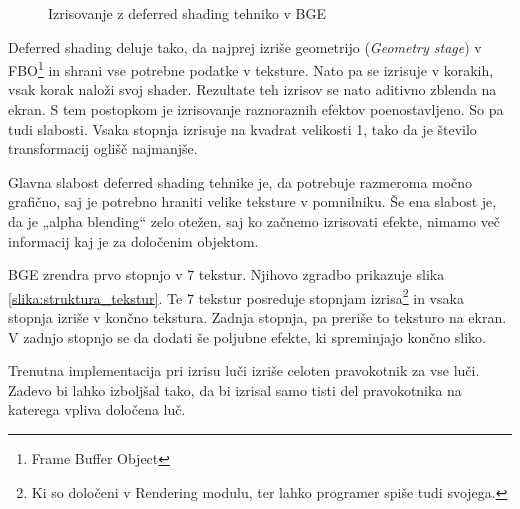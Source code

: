 \documentclass[a4paper]{article}
\begin{document}
\begin{figure}
  
  \label{slika:rendering}
  \caption{Izrisovanje z deferred shading tehniko v BGE}
\end{figure}

Deferred shading deluje tako, da najprej izriše geometrijo (\emph{Geometry stage}) v FBO\footnote{Frame Buffer Object} in shrani vse potrebne podatke v teksture. Nato pa se izrisuje v korakih, vsak korak naloži svoj shader. Rezultate teh izrisov se nato aditivno zblenda na ekran. S tem postopkom je izrisovanje raznoraznih efektov poenostavljeno. So pa tudi slabosti. Vsaka stopnja izrisuje na kvadrat velikosti 1, tako da je število transformacij oglišč najmanjše.

Glavna slabost deferred shading tehnike je, da potrebuje razmeroma močno grafično, saj je potrebno hraniti velike teksture v pomnilniku. Še ena slabost je, da je „alpha blending“ zelo otežen, saj ko začnemo izrisovati efekte, nimamo več informacij kaj je za določenim objektom.

BGE zrendra prvo stopnjo v 7 tekstur. Njihovo zgradbo prikazuje slika \ref{slika:struktura_tekstur}. Te 7 tekstur posreduje stopnjam izrisa\footnote{Ki so določeni v Rendering modulu, ter lahko programer spiše tudi svojega.} in vsaka stopnja izriše v končno tekstura. Zadnja stopnja, pa preriše to teksturo na ekran. V zadnjo stopnjo se da dodati še poljubne efekte, ki spreminjajo končno sliko.

Trenutna implementacija pri izrisu luči izriše celoten pravokotnik za vse luči. Zadevo bi lahko izboljšal tako, da bi izrisal samo tisti del pravokotnika na katerega vpliva določena luč.
\end{document}
